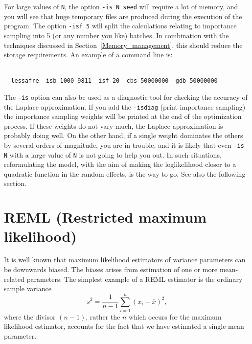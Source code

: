 \documentclass[12pt,letter,reqno]{book}
\begin{document}
For large values of \texttt{N}, the option \texttt{-is N seed} will require a lot of memory,
and you will see that huge temporary files are produced during the execution of the program.
The option \texttt{-isf 5} will split the calculations relating to importance sampling
into 5 (or any number you like) batches. In combination
with the techniques discussed in Section~\ref{Memory_management}, this should reduce the 
storage requirements. An example of a command line is:
\begin{lstlisting}

  lessafre -isb 1000 9811 -isf 20 -cbs 50000000 -gdb 50000000

\end{lstlisting}

The \texttt{-is} option can also be used as a diagnostic tool for checking the accuracy of 
the Laplace approximation. If you add the \texttt{-isdiag} (print importance sampling) the 
importance sampling weights will be printed at the end of the optimization process. 
If these weights do not vary much, the Laplace approximation is probably doing well. 
On the other hand, if a single weight dominates the others by several orders of magnitude, 
you are in trouble, and it is likely that even \texttt{-is N} with a large value of \texttt{N} 
is not going to help you out. In such situations, reformulating the model, with the aim of making 
the loglikelihood closer to a quadratic function in the random effects, is the way to go. 
See also the following section.

\section{REML (Restricted maximum likelihood)}
\label{sec:reml}
It is well known that maximum likelihood estimators of variance parameters can be downwards biased. The biases arises from
estimation of one or more mean-related parameters. The simplest example of a REML estimator is the ordinary sample
variance
$$
s^2 = \frac{1}{n-1}\sum_{i=1}^{n}(x_i-\bar x)^2,
$$
where the divisor $(n-1)$, rather the $n$ which occurs for the maximum likelihood estimator, accounts for the fact that we 
have estimated a single mean parameter.
\end{document}
